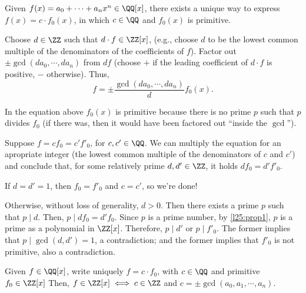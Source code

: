 \begin{lem}
	Given $f(x) = a_0 + \cdots + a_nx^n \in \QQ[x]$, there exists a unique way to express $f(x) = c \cdot f_0(x)$, in which $c \in \QQ$ and $f_0(x)$ is primitive.
	
\end{lem}

\begin{dem}[Existence]
	Choose $d \in \ZZ$ such that $d\cdot f \in \ZZ[x]$, (e.g., choose $d$ to be the lowest common multiple of the denominators of the coefficients of $f$).
	Factor out $\pm\gcd(da_0, \cdots, da_n)$ from $df$ (choose $+$ if the leading coefficient of $d\cdot f$ is positive, $-$ otherwise). Thus, 
	\[f = \pm \frac{\gcd(da_0, \cdots, da_n)}{d}f_0(x).\]

	In the equation above $f_0(x)$ is primitive because there is no prime $p$ such that $p$ divides $f_0$ (if there was, then it would have been factored out ``inside the $\gcd$''). 
\end{dem}

\begin{dem}[Uniqueness]
	Suppose $f = cf_0 = c'f'_0$, for $c, c' \in \QQ$. We can multiply the equation for an apropriate integer (the lowest common multiple of the denominators of $c$ and $c'$) and conclude that, for some relatively prime $d, d' \in \ZZ$, it holds $df_0 = d'f'_ 0$.

	If $d = d' = 1$, then $f_0 = f'_0$ and $c = c'$, so we're done!

	Otherwise, without loss of generality, $d > 0$. Then there exists a prime $p$ such that $p \mid d$. Then, $p \mid df_ 0 = d'f_0$. Since $p$ is a prime number, by \cref{l25:prop1}, $p$ is a prime as a polynomial in $\ZZ[x]$. Therefore, $p \mid d'$ or $p \mid f'_0$. The former implies that $p \mid \gcd(d, d') = 1$, a contradiction; and the former implies that $f'_0$ is not primitive, also a contradiction. 
\end{dem}

\begin{cor}
	Given $f \in \QQ[x]$, write uniquely $f = c \cdot f_0$, with $c \in \QQ$ and primitive $f_0 \in \ZZ[x]$	
	Then, $f \in \ZZ[x] \iff c\in\ZZ$ and $c = \pm\gcd(a_0, a_1, \cdots, a_n)$.	
\end{cor}
